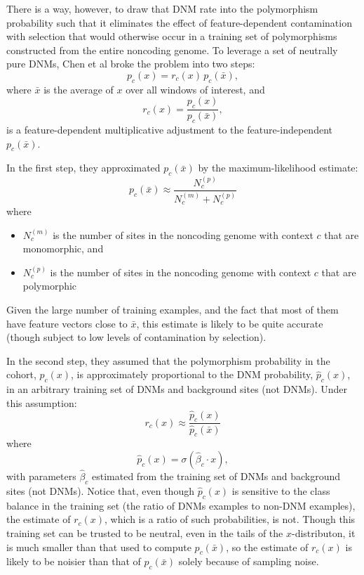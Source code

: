 \documentclass{article}
\begin{document}
There is a way, however, to draw that DNM rate 
into the polymorphism probability such that it eliminates the effect of 
feature-dependent contamination with selection that would otherwise occur in a training set 
of polymorphisms constructed from the entire noncoding genome. 
To leverage a set of neutrally pure DNMs, 
Chen et al broke the problem into two steps: 
\begin{equation}
    p_c(x) = r_c(x) \, p_c(\bar{x}),
\end{equation}
where $\bar{x}$ is the average of $x$ over all windows of interest, 
and
\begin{equation}
    r_c(x) = \frac{p_c(x)}{p_c(\bar{x})},
\end{equation}
is a feature-dependent multiplicative adjustment to the feature-independent 
$p_c(\bar{x})$.

In the first step, they approximated $p_c(\bar{x})$
by the maximum-likelihood estimate: 
\begin{equation}
    p_c(\bar{x}) \approx \frac{N_c^{(p)}}{N_c^{(m)} + N_c^{(p)}}
\end{equation}
where 
\begin{itemize} 
    \item $N_c^{(m)}$ is the number of sites in the noncoding genome with 
    context $c$ that are monomorphic, and
    \item $N_c^{(p)}$ is the number of sites in the noncoding genome with 
    context $c$ that are polymorphic
\end{itemize}
Given the large number of training examples, and the fact that 
most of them have feature vectors close to $\bar{x}$, 
this estimate is likely to be quite accurate
(though subject to low levels of contamination by selection).

In the second step, they assumed that the polymorphism probability
in the cohort, $p_c(x)$, 
is approximately proportional to the DNM probability, $\hat{p}_c(x)$,
in an arbitrary training set of DNMs and background sites (not DNMs).
Under this assumption:
\begin{equation}
    r_c(x) \approx \frac{\hat{p}_c(x)}{\hat{p}_c(\bar{x})}
\end{equation}
where 
\begin{equation}
\hat{p}_c(x) = \sigma(\hat{\beta}_c \cdot x),
\end{equation}
with parameters $\hat{\beta}_c$ estimated 
from the training set of DNMs and background sites (not DNMs).
Notice that, even though $\hat{p}_c(x)$ is sensitive to the class balance in the training set
(the ratio of DNMs examples to non-DNM examples), 
the estimate of $r_c(x)$, which is a ratio of such probabilities, is not.
Though this training set can be trusted to be neutral, even in the tails of the $x$-distributon, 
it is much smaller than that used to compute $p_c(\bar{x})$, 
so the estimate of $r_c(x)$ is likely to be noisier than that of $p_c(\bar{x})$
solely because of sampling noise.  
\end{document}
